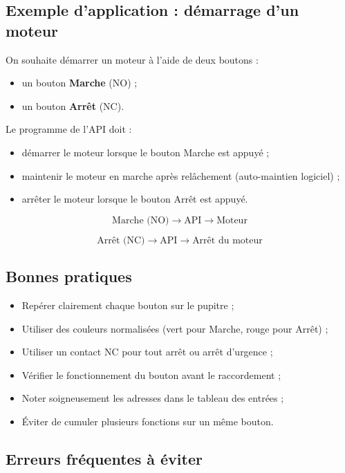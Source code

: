 \subsection{Exemple d'application : démarrage d'un moteur}

On souhaite démarrer un moteur à l'aide de deux boutons :

\begin{itemize}
    \item un bouton \textbf{Marche} (NO) ;
    \item un bouton \textbf{Arrêt} (NC).
\end{itemize}

Le programme de l'API doit :

\begin{itemize}
    \item démarrer le moteur lorsque le bouton Marche est appuyé ;
    \item maintenir le moteur en marche après relâchement (auto-maintien logiciel) ;
    \item arrêter le moteur lorsque le bouton Arrêt est appuyé.
\end{itemize}

\[
\text{Marche (NO)} \rightarrow \text{API} \rightarrow \text{Moteur}
\]

\[
\text{Arrêt (NC)} \rightarrow \text{API} \rightarrow \text{Arrêt du moteur}
\]

\subsection{Bonnes pratiques}

\begin{itemize}
    \item Repérer clairement chaque bouton sur le pupitre ;
    \item Utiliser des couleurs normalisées (vert pour Marche, rouge pour Arrêt) ;
    \item Utiliser un contact NC pour tout arrêt ou arrêt d'urgence ;
    \item Vérifier le fonctionnement du bouton avant le raccordement ;
    \item Noter soigneusement les adresses dans le tableau des entrées ;
    \item Éviter de cumuler plusieurs fonctions sur un même bouton.
\end{itemize}

\subsection{Erreurs fréquentes à éviter}

